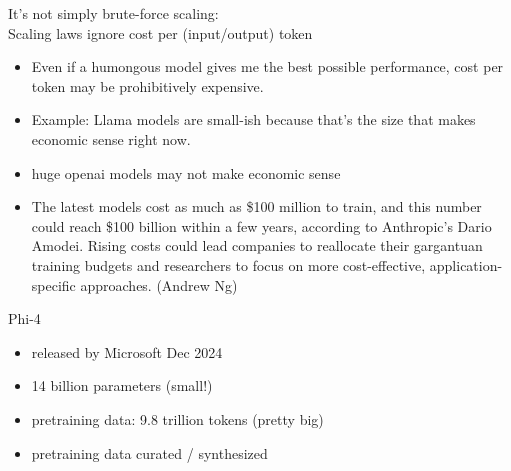 \begin{vbframe}{It's not simply brute-force scaling:\\
	Scaling laws ignore cost per (input/output) token}

\vfill

\begin{itemize}
	\item Even if a humongous model gives me the best
	possible performance, cost per token may be
	prohibitively expensive.
        \item Example: Llama models are small-ish because
	that's the size that makes economic sense right now.
        \item huge openai models may not make economic sense
        \item The
        latest models cost as much as \$100 million to train,
	and
        this number could reach \$100 billion within a few
	years,
        according to Anthropic’s Dario Amodei. Rising costs
	could
        lead companies to reallocate their gargantuan
	training
        budgets and researchers to focus on more
	cost-effective,
        application-specific approaches. (Andrew Ng)

\end{itemize}

\vfill

\end{vbframe}


\begin{vbframe}{Phi-4}

\vfill

\begin{itemize}
\item released by Microsoft Dec 2024
	\item 14 billion parameters (small!)
	\item pretraining data: 9.8 trillion tokens (pretty big)
        \item pretraining data curated / synthesized
\end{itemize}

\vfill

\end{vbframe}


